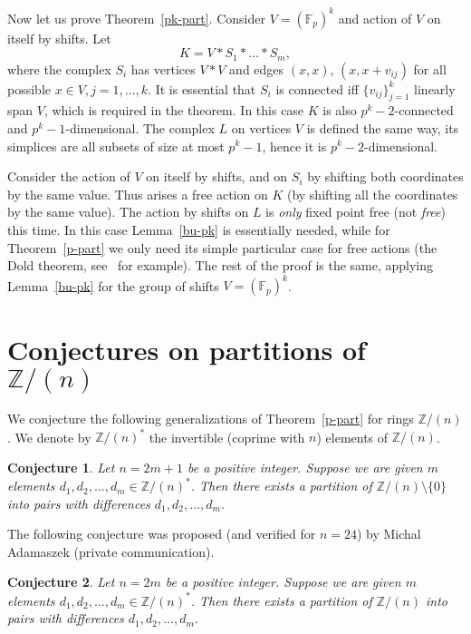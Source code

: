 \documentclass[12pt,a4paper]{amsart}
\newtheorem{con}{Conjecture}
\theoremstyle{definition}
\theoremstyle{remark}
\begin{document}
Now let us prove Theorem~\ref{pk-part}. Consider $V=({{\mathbb F_p}})^k$ and action of $V$ on itself by shifts. Let
$$
K = V*S_1*\dots*S_m,
$$
where the complex $S_i$ has vertices $V*V$ and edges $(x,x)$, $(x, x+ v_{ij})$ for all possible $x\in V, j=1,\ldots,k$. It is essential that $S_i$ is connected iff $\{v_{ij}\}_{j=1}^k$ linearly span $V$, which is required in the theorem. In this case $K$ is also $p^k-2$-connected and $p^k-1$-dimensional. The complex $L$ on vertices $V$ is defined the same way, its simplices are all subsets of size at most $p^k-1$, hence it is $p^k-2$-dimensional. 

Consider the action of $V$ on itself by shifts, and on $S_i$ by shifting both coordinates by the same value. Thus arises a free action on $K$ (by shifting all the coordinates by the same value). The action by shifts on $L$ is \emph{only} fixed point free (not \emph{free}) this time. In this case Lemma~\ref{bu-pk} is essentially needed, while for Theorem~\ref{p-part} we only need its simple particular case for free actions (the Dold theorem, see~\cite{mat2003} for example). The rest of the proof is the same, applying Lemma~\ref{bu-pk} for the group of shifts $V=({{\mathbb F_p}})^k$.

\section{Conjectures on partitions of $\mathbb Z/(n)$}
\label{zn-pairs-sec}

We conjecture the following generalizations of Theorem~\ref{p-part} for rings $\mathbb Z/(n)$. We denote by $\mathbb Z/(n)^*$ the invertible (coprime with $n$) elements of $\mathbb Z/(n)$.

\begin{con}
\label{odd-part}
Let $n=2m+1$ be a positive integer. Suppose we are given $m$ elements $d_1, d_2,\ldots, d_m\in \mathbb Z/(n)^*$. Then there exists a partition of $\mathbb Z/(n)\setminus\{0\}$ into pairs with differences $d_1, d_2,\ldots, d_m$.
\end{con}

The following conjecture was proposed (and verified for $n=24$) by Michal Adamaszek (private communication).

\begin{con}
\label{even-part}
Let $n=2m$ be a positive integer. Suppose we are given $m$ elements $d_1, d_2,\ldots, d_m\in \mathbb Z/(n)^*$. Then there exists a partition of $\mathbb Z/(n)$ into pairs with differences $d_1, d_2,\ldots, d_m$.
\end{con}
\end{document}
